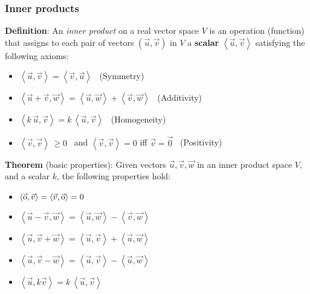 \newcommand{\R}{\mathbb{R}}

\newcommand{\norm}[1]{\lVert#1\rVert} %

\newcommand{\avg}[1]{\left< #1 \right>} %

\newcommand{\sabs}[1]{\left| #1 \right|} %
\newcommand{\abs}[1]{\bigl| #1 \bigr|} %



\begin{frame}[fragile] \frametitle{Inner products}

\textbf{Definition}: An {\em inner product} on a real vector space $V$ is an operation (function) that assigns to each pair of vectors $(\vec{u}, \vec{v})$ in $V$ a \textbf{scalar} $\avg{ \vec{u}, \vec{v} }$ satisfying the following axioms:

\begin{itemize}

\item  $\avg{ \vec{u}, \vec{v} } =  \avg{ \vec{v}, \vec{u} } $   \ (Symmetry)

\item   $\avg{ \vec{u} + \vec{v}, \vec{w} }   =  \avg{ \vec{u}, \vec{w} } +  \avg{ \vec{v}, \vec{w} }$  \ (Additivity)

\item  $\avg{ k \, \vec{u}, \vec{v} }  = k  \, \avg{ \vec{u}, \vec{v} }$ \ (Homogeneity)

\item  $\avg{ \vec{v}, \vec{v} } \, \ge 0$  \ and  $\avg{ \vec{v}, \vec{v} } = 0$ iff $\vec{v} = \vec{0}$ \ (Positivity)


\end{itemize}





\textbf{Theorem} (basic properties): Given vectors $\vec{u}, \vec{v}, \vec{w}$ in an inner product space $V$, and a scalar $k$, the following properties hold:

\begin{itemize}

\item $\avg{ \vec{\rm{o}}, \vec{v} } = \avg{ \vec{v}, \vec{\rm{o}} }  = 0$

\item $\avg{ \vec{u} - \vec{v}, \vec{w} }   =  \avg{ \vec{u}, \vec{w} } -  \avg{ \vec{v}, \vec{w} }$

\item $\avg{ \vec{u}, \vec{v} + \vec{w} }   =  \avg{ \vec{u}, \vec{v} } +  \avg{ \vec{u}, \vec{w} }$

\item $\avg{ \vec{u}, \vec{v} - \vec{w} }   =  \avg{ \vec{u}, \vec{v} }  -  \avg{ \vec{u}, \vec{w} }$

\item  $\avg{ \vec{u}, k \vec{ v} }  = k  \, \avg{ \vec{u}, \vec{v} }$

\end{itemize}

\end{frame}


